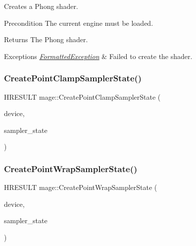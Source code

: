 Creates a Phong shader.

\begin{DoxyPrecond}{Precondition}
The current engine must be loaded. 
\end{DoxyPrecond}
\begin{DoxyReturn}{Returns}
The Phong shader. 
\end{DoxyReturn}

\begin{DoxyExceptions}{Exceptions}
{\em \hyperlink{structmage_1_1_formatted_exception}{Formatted\+Exception}} & Failed to create the shader. \\
\hline
\end{DoxyExceptions}
\hypertarget{namespacemage_a9f3a3ef8e9a08654f98dfaa2e6c77da8}{}\label{namespacemage_a9f3a3ef8e9a08654f98dfaa2e6c77da8} 
\subsubsection{\texorpdfstring{Create\+Point\+Clamp\+Sampler\+State()}{CreatePointClampSamplerState()}}
{\footnotesize\ttfamily H\+R\+E\+S\+U\+LT mage\+::\+Create\+Point\+Clamp\+Sampler\+State (\begin{DoxyParamCaption}\item[{I\+D3\+D11\+Device2 $\ast$}]{device,  }\item[{I\+D3\+D11\+Sampler\+State $\ast$$\ast$}]{sampler\+\_\+state }\end{DoxyParamCaption})}

\hypertarget{namespacemage_a172296a60b063da1f01ad0a4ec828772}{}\label{namespacemage_a172296a60b063da1f01ad0a4ec828772} 
\subsubsection{\texorpdfstring{Create\+Point\+Wrap\+Sampler\+State()}{CreatePointWrapSamplerState()}}
{\footnotesize\ttfamily H\+R\+E\+S\+U\+LT mage\+::\+Create\+Point\+Wrap\+Sampler\+State (\begin{DoxyParamCaption}\item[{I\+D3\+D11\+Device2 $\ast$}]{device,  }\item[{I\+D3\+D11\+Sampler\+State $\ast$$\ast$}]{sampler\+\_\+state }\end{DoxyParamCaption})}

